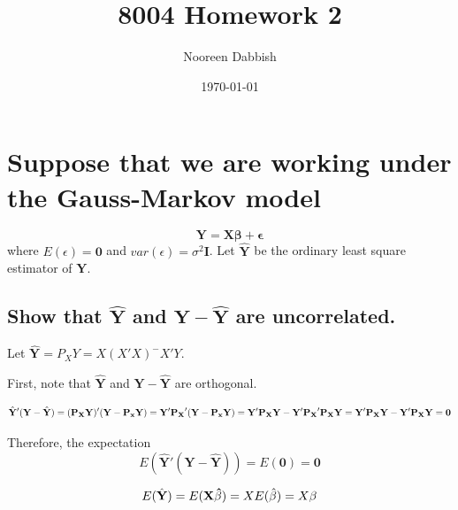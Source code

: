 \documentclass[11pt]{article}
\title{8004 Homework 2}
\author{Nooreen Dabbish}
\date{\today}
\begin{document}
\maketitle


\section{Suppose that we are working under the Gauss-Markov model}
\label{sec-1}

\[ \mathbf{Y} = \mathbf{X\beta} + \mathbf{\epsilon} \]
where $E(\epsilon) = \mathbf{0}$ and
$var(\epsilon)=\sigma^2\mathbf{I}$. Let $\hat{\mathbf{Y}}$ be the
ordinary least square estimator of $\mathbf{Y}$.
 
\subsection{Show that $\hat{\mathbf{Y}}$ and $\mathbf{Y} - \hat{\mathbf{Y}}$ are uncorrelated.}
\label{sec-1-1}


Let $\hat{\mathbf{Y}} = P_X Y = X(X'X)^{-}X'Y$.

First, note that $\hat{\mathbf{Y}}$ and $\mathbf{Y} -
\hat{\mathbf{Y}}$ are orthogonal.

\[
\hat{\mathbf{Y}}'(\mathbf{Y} - \hat{\mathbf{Y}}) = (\mathbf{P_X Y})'(\mathbf{Y} - \mathbf{P_x Y})\\
                                                 = \mathbf{Y}'
                                                 \mathbf{P_X}' (\mathbf{Y} -
                                                 \mathbf{P_x Y})\\
                                                 =
                                                 \mathbf{Y}'\mathbf{P_X
                                                 Y} -
                                                 \mathbf{Y}'\mathbf{P_X}'\mathbf{P_X
                                                 Y}\\
                                                 =
                                                 \mathbf{Y}'\mathbf{P_X}\mathbf{Y} -
                                                 \mathbf{Y}'\mathbf{P_X}\mathbf{Y}\\
                                                 =\mathbf{0}
\]

Therefore, the expectation 
\[
E(\hat{\mathbf{Y}}'(\mathbf{Y} -
\hat{\mathbf{Y}}))=E(\mathbf{0})=\mathbf{0}
\]

\[
E(\hat{\mathbf{Y}})=E(\mathbf{X\hat{\beta}})\\
                   =X E(\hat{\beta})\\
                   =X\beta
\]
\end{document}
